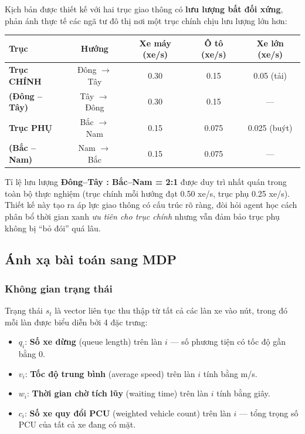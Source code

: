 Kịch bản được thiết kế với hai trục giao thông có \textbf{lưu lượng bất đối xứng}, phản ánh thực tế các ngã tư đô thị nơi một trục chính chịu lưu lượng lớn hơn:

\begin{center}
\begin{tabular}{|l|c|c|c|c|}
\hline
\textbf{Trục} & \textbf{Hướng} & \textbf{Xe máy (xe/s)} & \textbf{Ô tô (xe/s)} & \textbf{Xe lớn (xe/s)} \\
\hline
\textbf{Trục CHÍNH} & Đông $\to$ Tây & 0.30 & 0.15 & 0.05 (tải) \\
\textbf{(Đông -- Tây)} & Tây $\to$ Đông & 0.30 & 0.15 & --- \\
\hline
\textbf{Trục PHỤ} & Bắc $\to$ Nam & 0.15 & 0.075 & 0.025 (buýt) \\
\textbf{(Bắc -- Nam)} & Nam $\to$ Bắc & 0.15 & 0.075 & --- \\
\hline
\end{tabular}
\end{center}

\vspace{6pt}
Tỉ lệ lưu lượng \textbf{Đông--Tây : Bắc--Nam = 2:1} được duy trì nhất quán trong toàn bộ thực nghiệm (trục chính mỗi hướng đạt 0.50 xe/s, trục phụ 0.25 xe/s). Thiết kế này tạo ra áp lực giao thông có cấu trúc rõ ràng, đòi hỏi agent học cách phân bổ thời gian xanh \textit{ưu tiên cho trục chính} nhưng vẫn đảm bảo trục phụ không bị ``bỏ đói'' quá lâu.

\subsection{Ánh xạ bài toán sang MDP}

\subsubsection{Không gian trạng thái}

Trạng thái $s_t$ là vector liên tục thu thập từ tất cả các làn xe vào nút, trong đó mỗi làn được biểu diễn bởi 4 đặc trưng:

\begin{itemize}
    \item $q_i$: \textbf{Số xe dừng} (queue length) trên làn $i$ --- số phương tiện có tốc độ gần bằng 0.
    \item $v_i$: \textbf{Tốc độ trung bình} (average speed) trên làn $i$ tính bằng m/s.
    \item $w_i$: \textbf{Thời gian chờ tích lũy} (waiting time) trên làn $i$ tính bằng giây.
    \item $c_i$: \textbf{Số xe quy đổi PCU} (weighted vehicle count) trên làn $i$ --- tổng trọng số PCU của tất cả xe đang có mặt.
\end{itemize}

